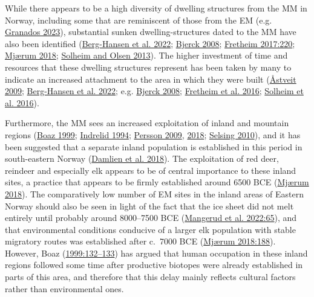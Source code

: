 \documentclass[
  a4paper,
  oneside]{uiophdthesis}
\begin{document}
While there appears to be a high diversity of dwelling structures from the MM in Norway, including some that are reminiscent of those from the EM (e.g. \protect\hyperlink{ref-granados2023}{Granados 2023}), substantial sunken dwelling-structures dated to the MM have also been identified (\protect\hyperlink{ref-berg-hansen2022}{Berg-Hansen et al. 2022}; \protect\hyperlink{ref-bjerck2008}{Bjerck 2008}; \protect\hyperlink{ref-fretheim2017}{Fretheim 2017:220}; \protect\hyperlink{ref-mjuxe6rum2018}{Mjærum 2018}; \protect\hyperlink{ref-solheim2013}{Solheim and Olsen 2013}). The higher investment of time and resources that these dwelling structures represent has been taken by many to indicate an increased attachment to the area in which they were built (\protect\hyperlink{ref-uxe5stveit2009}{Åstveit 2009}; \protect\hyperlink{ref-berg-hansen2022}{Berg-Hansen et al. 2022}; e.g. \protect\hyperlink{ref-bjerck2008}{Bjerck 2008}; \protect\hyperlink{ref-fretheim2016}{Fretheim et al. 2016}; \protect\hyperlink{ref-solheim2016}{Solheim et al. 2016}).

Furthermore, the MM sees an increased exploitation of inland and mountain regions (\protect\hyperlink{ref-boaz1999}{Boaz 1999}; \protect\hyperlink{ref-indrelid1994}{Indrelid 1994}; \protect\hyperlink{ref-persson2009}{Persson 2009}, \protect\hyperlink{ref-persson2018}{2018}; \protect\hyperlink{ref-selsing2010}{Selsing 2010}), and it has been suggested that a separate inland population is established in this period in south-eastern Norway (\protect\hyperlink{ref-damlien2018}{Damlien et al. 2018}). The exploitation of red deer, reindeer and especially elk appears to be of central importance to these inland sites, a practice that appears to be firmly established around 6500 BCE (\protect\hyperlink{ref-mjuxe6rum2018}{Mjærum 2018}). The comparatively low number of EM sites in the inland areas of Eastern Norway should also be seen in light of the fact that the ice sheet did not melt entirely until probably around 8000--7500 BCE (\protect\hyperlink{ref-mangerud2022}{Mangerud et al. 2022:65}), and that environmental conditions conducive of a larger elk population with stable migratory routes was established after c.~7000 BCE (\protect\hyperlink{ref-mjuxe6rum2018}{Mjærum 2018:188}). However, Boaz (\protect\hyperlink{ref-boaz1999}{1999:132--133}) has argued that human occupation in these inland regions followed some time after productive biotopes were already established in parts of this area, and therefore that this delay mainly reflects cultural factors rather than environmental ones.
\end{document}
